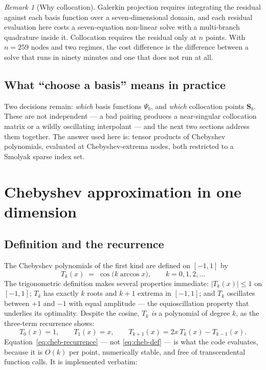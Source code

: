 \documentclass[11pt]{article}
\numberwithin{equation}{section}
\newcommand{\bS}{\mathbf{S}}
\theoremstyle{definition}
\theoremstyle{plain}
\theoremstyle{remark}
\newtheorem{remark}{Remark}[section]
\begin{document}
\begin{remark}[Why collocation]
Galerkin projection requires integrating the residual against each basis function
over a seven-dimensional domain, and each residual evaluation here costs a
seven-equation non-linear solve with a multi-branch quadrature inside it. Collocation
requires the residual only at $n$ points. With $n=259$ nodes and two regimes, the
cost difference is the difference between a solve that runs in ninety minutes and one
that does not run at all.
\end{remark}

\subsection{What ``choose a basis'' means in practice}

Two decisions remain: \emph{which} basis functions $\Psi_b$, and \emph{which}
collocation points $\bS_b$. These are not independent --- a bad pairing produces a
near-singular collocation matrix or a wildly oscillating interpolant --- and the next
two sections address them together. The answer used here is: tensor products of
Chebyshev polynomials, evaluated at Chebyshev-extrema nodes, both restricted to a
Smolyak sparse index set.

\section{Chebyshev approximation in one dimension}
\label{sec:chebyshev}

\subsection{Definition and the recurrence}

The Chebyshev polynomials of the first kind are defined on $[-1,1]$ by
\begin{equation}
T_k(x)\;=\;\cos\bigl(k\arccos x\bigr),
\qquad k=0,1,2,\dots
\label{eq:cheb-def}
\end{equation}
The trigonometric definition makes several properties immediate: $|T_k(x)|\le1$ on
$[-1,1]$; $T_k$ has exactly $k$ roots and $k+1$ extrema in $[-1,1]$; and $T_k$
oscillates between $+1$ and $-1$ with equal amplitude --- the equioscillation
property that underlies its optimality. Despite the cosine, $T_k$ \emph{is} a
polynomial of degree $k$, as the three-term recurrence shows:
\begin{equation}
T_0(x)=1,\qquad T_1(x)=x,\qquad
T_{k+1}(x)=2x\,T_k(x)-T_{k-1}(x).
\label{eq:cheb-recurrence}
\end{equation}
Equation~\eqref{eq:cheb-recurrence} --- not \eqref{eq:cheb-def} --- is what the code
evaluates, because it is $O(k)$ per point, numerically stable, and free of
transcendental function calls. It is implemented verbatim:
\end{document}
